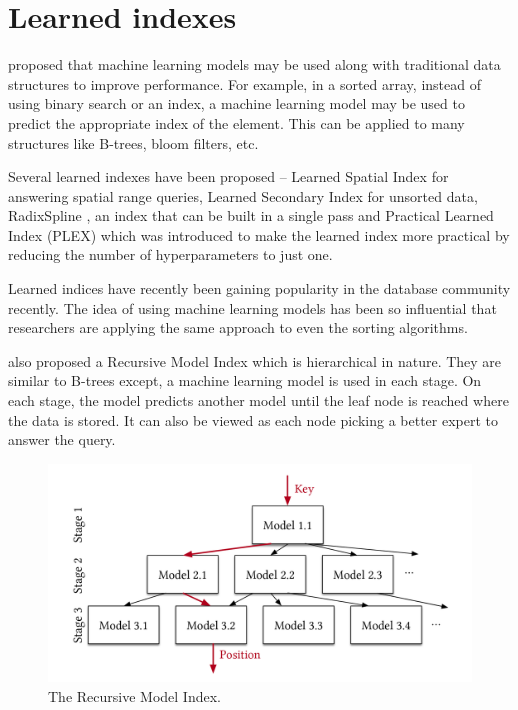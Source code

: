 \section{Learned indexes}

\citet{kraskaCaseLearnedIndex2018a} proposed that machine learning models may be
used along with traditional data structures to improve performance. For example,
in a sorted array, instead of using binary search or an index, a machine
learning model may be used to predict the appropriate index of the element. This
can be applied to many structures like B-trees, bloom filters, etc.

Several learned indexes have been proposed -- Learned Spatial Index
\cite{pandeyCaseLearnedSpatial2020} for answering spatial range queries, Learned
Secondary Index \cite{kipfLSILearnedSecondary2022} for unsorted data,
RadixSpline \cite{kipfRadixSplineSinglePassLearned2020}, an index that can be
built in a single pass and Practical Learned Index (PLEX)
\cite{stoianPracticalLearnedIndexing2021} which was introduced to make the
learned index more practical by reducing the number of hyperparameters to just
one.

Learned indices have recently been gaining popularity in the database community
recently. The idea of using machine learning models has been so influential that
researchers are applying the same approach to even the sorting algorithms.
\cite{kristoCaseLearnedSorting2020}

\citet{kraskaCaseLearnedIndex2018} also proposed a Recursive Model Index which
is hierarchical in nature. They are similar to B-trees except, a machine
learning model is used in each stage. On each stage, the model predicts another
model until the leaf node is reached where the data is stored. It can also be
viewed as each node picking a better expert to answer the query.

\begin{figure}[h]
      \centering
      \includegraphics[width=1.0\textwidth]{RMI.png}
      \caption{The Recursive Model Index. \cite{kraskaCaseLearnedIndex2018}}
\end{figure}
